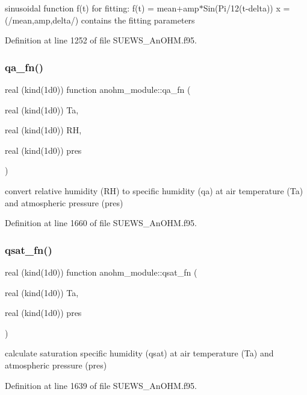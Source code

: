 sinusoidal function f(t) for fitting\+: f(t) = mean+amp$\ast$\+Sin(Pi/12(t-\/delta)) x = (/mean,amp,delta/) contains the fitting parameters 



Definition at line 1252 of file S\+U\+E\+W\+S\+\_\+\+An\+O\+H\+M.\+f95.

\mbox{\label{namespaceanohm__module_ac9feb33254cb5595d19ad7f8a012ef92}} 
\subsubsection{\texorpdfstring{qa\+\_\+fn()}{qa\_fn()}}
{\footnotesize\ttfamily real (kind(1d0)) function anohm\+\_\+module\+::qa\+\_\+fn (\begin{DoxyParamCaption}\item[{real (kind(1d0))}]{Ta,  }\item[{real (kind(1d0))}]{RH,  }\item[{real (kind(1d0))}]{pres }\end{DoxyParamCaption})}



convert relative humidity (RH) to specific humidity (qa) at air temperature (Ta) and atmospheric pressure (pres) 



Definition at line 1660 of file S\+U\+E\+W\+S\+\_\+\+An\+O\+H\+M.\+f95.

\mbox{\label{namespaceanohm__module_a0db1439a632619dd005b69ce0fcb9cbe}} 
\subsubsection{\texorpdfstring{qsat\+\_\+fn()}{qsat\_fn()}}
{\footnotesize\ttfamily real (kind(1d0)) function anohm\+\_\+module\+::qsat\+\_\+fn (\begin{DoxyParamCaption}\item[{real (kind(1d0))}]{Ta,  }\item[{real (kind(1d0))}]{pres }\end{DoxyParamCaption})}



calculate saturation specific humidity (qsat) at air temperature (Ta) and atmospheric pressure (pres) 



Definition at line 1639 of file S\+U\+E\+W\+S\+\_\+\+An\+O\+H\+M.\+f95.

